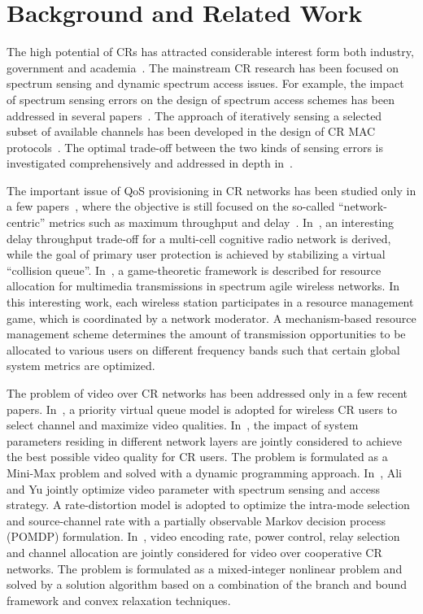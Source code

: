 \documentclass[12pt,onecolumn,draftclsnofoot]{IEEEtran} %
\begin{document}
\section{Background and Related Work}\label{sec:cr_video_work}
%
The high potential of CRs has attracted considerable interest form both industry, government and academia~\cite{Akyildiz06, Zhao07a}. The mainstream CR research has been focused on spectrum sensing and dynamic spectrum access issues. For example, the impact of spectrum sensing errors on the design of spectrum access schemes has been addressed in several papers~\cite{Chen08,Urgaonkar09,Shu09}. The approach of iteratively sensing a selected subset of available channels has been developed in the design of CR MAC protocols~\cite{Su08,Zhao08}. The optimal trade-off between the two kinds of sensing errors is investigated comprehensively and addressed in depth in~\cite{Chen08}. 


The important issue of QoS provisioning in CR networks has been studied only in a few papers~\cite{Su08,Fattahi07}, where the objective is still focused on the so-called ``network-centric'' metrics such as maximum throughput and delay~\cite{Su08,Urgaonkar09}. In~\cite{Urgaonkar09},  an interesting delay throughput trade-off for a multi-cell cognitive radio network is derived, while the goal of primary user protection is achieved by stabilizing a virtual ``collision queue''. In~\cite{Fattahi07}, a game-theoretic framework is described for resource allocation for multimedia transmissions in spectrum agile wireless networks. In this interesting work, each wireless station participates in a resource management game, which is coordinated by a network moderator. A mechanism-based resource management scheme determines the amount of transmission opportunities to be allocated to various users on different frequency bands such that certain global system metrics are optimized. 

The problem of video over CR networks has been addressed only in a few recent papers. In~\cite{Shiang08}, a priority virtual queue model is adopted for wireless CR users to select channel and maximize video qualities. In~\cite{Luo11}, the impact of system parameters residing in different network layers are jointly considered to achieve the best possible video quality for CR users. The problem is formulated as a Mini-Max problem and solved with a dynamic programming approach. In~\cite{Ali09}, Ali and Yu jointly optimize video parameter with spectrum sensing and access strategy. A rate-distortion model is adopted to optimize the intra-mode selection and source-channel rate with a partially observable Markov decision process (POMDP) formulation. In~\cite{Guan11}, video encoding rate, power control, relay selection and channel allocation are jointly considered for video over cooperative CR networks. The problem is formulated as a mixed-integer nonlinear problem and solved by a solution algorithm based on a combination of the branch and bound framework and convex relaxation techniques. 
\end{document}
